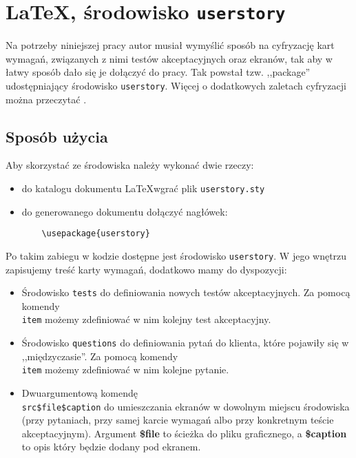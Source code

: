 \chapter{\LaTeX, środowisko \texttt{userstory}}
\label{cha:dodatekA}

Na potrzeby niniejszej pracy autor musiał wymyślić sposób na cyfryzację kart wymagań, związanych z nimi testów akceptacyjnych oraz ekranów, tak aby w łatwy sposób dało się je dołączyć do pracy. Tak powstał tzw. ,,package'' udostępniający środowisko \texttt{userstory}. Więcej o dodatkowych zaletach cyfryzacji można przeczytać .

\section{Sposób użycia}
\label{sec:dodatekAsu}

Aby skorzystać ze środowiska należy wykonać dwie rzeczy:
\begin{itemize}
    \item do katalogu dokumentu \LaTeX wgrać plik \texttt{userstory.sty}
    \item do generowanego dokumentu dołączyć nagłówek:
    \begin{lstlisting}
    \usepackage{userstory}
    \end{lstlisting}
\end{itemize}

Po takim zabiegu w kodzie dostępne jest środowisko \texttt{userstory}. W jego wnętrzu zapisujemy treść karty wymagań, dodatkowo mamy do dyspozycji:
\begin{itemize}
    \item Środowisko \texttt{tests} do definiowania nowych testów akceptacyjnych. Za pomocą komendy \texttt{\\item} możemy zdefiniować w nim kolejny test akceptacyjny.
    \item Środowisko \texttt{questions} do definiowania pytań do klienta, które pojawiły się w ,,międzyczasie''. Za pomocą komendy \texttt{\\item} możemy zdefiniować w nim kolejne pytanie.
    \item Dwuargumentową komendę \texttt{\\src{\$file}{\$caption}} do umieszczania ekranów w dowolnym miejscu środowiska (przy pytaniach, przy samej karcie wymagań albo przy konkretnym teście akceptacyjnym). Argument \textbf{\$file} to ścieżka do pliku graficznego, a \textbf{\$caption} to opis który będzie dodany pod ekranem.
\end{itemize}

